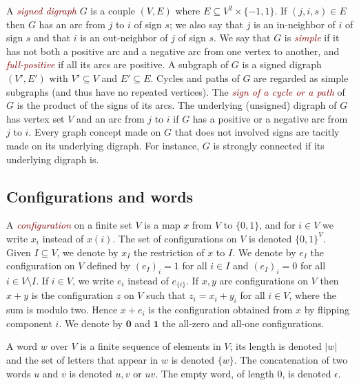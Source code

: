 \documentclass[11pt,letter]{article}
\newcommand{\EM}[1]{{\em\textcolor{Maroon}{#1}}}
\newcommand{\B}{\{0,1\}}
\newcommand{\ONE}{\mathbf{1}}
\newcommand{\ZERO}{{\mathbf{0}}}
\begin{document}
\medskip
A \EM{signed digraph} $G$ is a couple $(V,E)$ where $E\subseteq V^2\times\{-1,1\}$. If $(j,i,s)\in E$ then $G$ has an arc from $j$ to $i$ of sign $s$; we also say that $j$ is an in-neighbor of $i$ of sign $s$ and that $i$ is an out-neighbor of $j$ of sign $s$. We say that $G$ is \EM{simple} if it has not both a positive arc and a negative arc from one vertex to another, and \EM{full-positive} if all its arcs are positive. A subgraph of $G$ is a signed digraph $(V',E')$ with $V'\subseteq V$ and $E'\subseteq E$. Cycles and paths of $G$ are regarded as simple subgraphs (and thus have no repeated vertices). The \EM{sign of a cycle or a path} of $G$ is the product of the signs of its arcs. The underlying (unsigned) digraph of $G$ has vertex set $V$ and an arc from $j$ to $i$ if $G$ has a positive or a negative arc from $j$ to $i$. Every graph concept made on $G$ that does not involved signs are tacitly made on its underlying digraph. For instance, $G$ is strongly connected if its underlying digraph is.

\subsection{Configurations and words}

A \EM{configuration} on a finite set $V$ is a map $x$ from $V$ to $\{0,1\}$, and for $i\in V$ we write $x_i$ instead of $x(i)$. The set of configurations on $V$ is denoted $\B^V$. Given $I\subseteq V$, we denote by $x_I$ the restriction of $x$ to $I$. We denote by $e_I$ the configuration on $V$ defined by $(e_I)_i=1$ for all $i\in I$ and $(e_I)_i=0$ for all $i\in V\setminus I$. If $i\in V$, we write $e_i$ instead of $e_{\{i\}}$. If $x,y$ are configurations on $V$ then $x+y$ is the configuration $z$ on $V$ such that $z_i=x_i+y_i$ for all $i\in V$, where the sum is modulo two. Hence $x+e_i$ is the configuration obtained from $x$ by flipping component $i$. We denote by $\ZERO$ and $\ONE$ the all-zero and all-one configurations. 

\medskip
A word $w$ over $V$ is a finite sequence of elements in $V$; its length is denoted $|w|$ and the set of letters that appear in $w$ is denoted $\{w\}$. The concatenation of two words $u$ and $v$ is denoted $u,v$ or $uv$. The empty word, of length $0$, is denoted $\epsilon$.  
\end{document}
